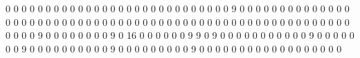 0 0 0 0 0 0 0 0 0 0 0 0 0 0 0 0 0 0 0 0 0 0 0 0 0 0 0 0 9 0 0 0 0 0 0 0 0 0 0 0 0 0 0 0 0 0 0 0 0 0 0 0 0 0 0 0 0 0 0 0 0 0 0 0 0 0 0 0 0 0 0 0 0 0 0 0 0 0 0 0 0 0 0 0 0 0 0 0 0 0 9 0 0 0 0 0 0 0 0 9 0 16 0 0 0 0 0 0 9 9 0 9 0 0 0 0 0 0 0 0 0 0 0 9 0 0 0 0 0 0 0 9 0 0 0 0 0 0 0 0 0 0 9 0 0 0 0 0 0 0 0 0 9 0 0 0 0 0 0 0 0 0 0 0 0 0 0 0 0 0 0 